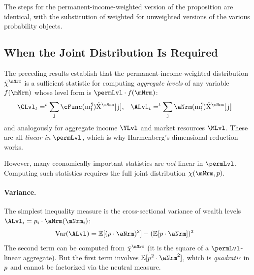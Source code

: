 \documentclass[\econtexRoot/BufferStockTheory]{subfiles}
\begin{document}
The steps for the permanent-income-weighted version of the proposition are identical, with the substitution of weighted for unweighted versions of the various probability objects.


\subsection{When the Joint Distribution Is Required}\label{sec:JointDistRequired}

The preceding results establish that the permanent-income-weighted distribution $\mpPrbMargWgt$ is a sufficient statistic for computing \textit{aggregate levels} of any variable $f(\mNrm)$ whose level form is $\permLvl \cdot f(\mNrm)$:
\begin{equation}\begin{gathered}\begin{aligned}
  \CLvl_{t} & = \PermGroFac^{t} \sum_{\nmNrmVecNow} \cFunc(\mNrmVecNow) \mpMatMargWgt[\nmNrmVecNow], &
  \ALvl_{t} & = \PermGroFac^{t} \sum_{\nmNrmVecNow} \aNrm(\mNrmVecNow) \mpMatMargWgt[\nmNrmVecNow]
\end{aligned}\end{gathered}\end{equation}
and analogously for aggregate income $\YLvl$ and market resources $\MLvl$. These are all \textit{linear in} $\permLvl$, which is why Harmenberg's dimensional reduction works.

However, many economically important statistics are \textit{not} linear in $\permLvl$. Computing such statistics requires the full joint distribution $\mpPrb(\mNrm, \permLvlPrb)$.

\paragraph{Variance.}
The simplest inequality measure is the cross-sectional variance of wealth levels $\ALvl_i = \permLvlPrb_i \cdot \aNrm(\mNrm_i)$:
\begin{equation}\begin{gathered}\begin{aligned} \label{eq:VarA}
  \textup{Var}(\ALvl) & = \mathbb{E}[(\permLvlPrb \cdot \aNrm)^{2}] - (\mathbb{E}[\permLvlPrb \cdot \aNrm])^{2}
\end{aligned}\end{gathered}\end{equation}
The second term can be computed from $\mpPrbMargWgt$ (it is the square of a $\permLvl$-linear aggregate). But the first term involves $\mathbb{E}[\permLvlPrb^{2} \cdot \aNrm^{2}]$, which is \textit{quadratic} in $p$ and cannot be factorized via the neutral measure.
\end{document}
